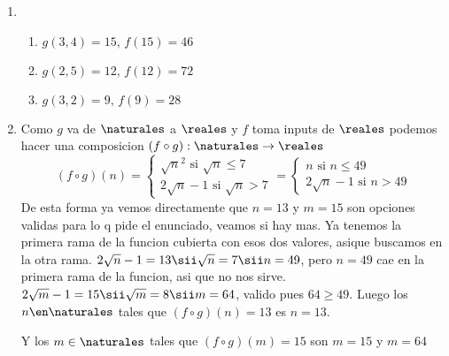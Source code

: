 \begin{enumerate}[label=\roman*)]
\item \begin{enumerate}
        \item $g(3, 4) = 15, \, f(15) = 46$
        \item $g(2,5) = 12, \, f(12) = 72$
        \item $g(3,2) = 9, \, f(9) = 28$
      \end{enumerate}

\item \begin{enumerate}
       Como $g$ va de $\naturales$ a $\reales$ y $f$ toma inputs de $\reales$ podemos hacer una composicion
       $(f \circ g): \naturales \to \reales$
       $$
       (f \circ g)(n) =
       \begin{cases}
       \sqrt{n}^2 \text{ si } \sqrt{n} \leq 7 \\
       2\sqrt{n} - 1 \text{ si } \sqrt{n} > 7 
       \end{cases}
       =
       \begin{cases}
       n \text{ si } n \leq 49 \\
       2\sqrt{n} - 1 \text{ si } n > 49 
       \end{cases}
       $$
       De esta forma ya vemos directamente que $n = 13$ y $m = 15$ son opciones validas para lo q pide el enunciado, veamos
       si hay mas. 
       Ya tenemos la primera rama de la funcion cubierta con esos dos valores, asique buscamos en la otra rama.  
       $2\sqrt{n} - 1 = 13 \sii \sqrt{n} = 7 \sii n = 49$, pero $n = 49$ cae en la primera rama de la funcion, asi que no nos sirve. 
       $2\sqrt{m} - 1 = 15 \sii \sqrt{m} = 8 \sii m =64$, valido pues $64 \geq 49$. 
       Luego los $n \en \naturales$ tales que $(f \circ g)(n) = 13$ es $n = 13$. 

       Y los  $m \in \naturales$ tales que $(f \circ g)(m) = 15$ son $m = 15$ y $m = 64$
      \end{enumerate}
\end{enumerate}

\begin{aportes}
 \item {}
\end{aportes}